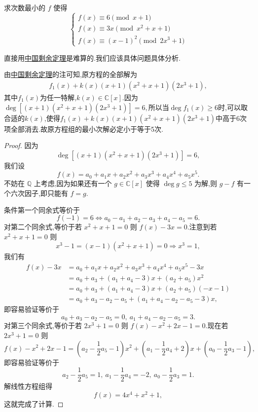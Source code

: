 \documentclass[../../main.tex]{subfiles}%
\begin{document}
\begin{example}
求次数最小的 \( f \) 使得
\[
\begin{cases}
f(x) \equiv 6 \pmod{x + 1} \\
f(x) \equiv 3x \pmod{x^2 + x + 1} \\
f(x) \equiv (x - 1)^2 \pmod{2x^3 + 1}
\end{cases}
\]
\end{example}
\begin{remark}
直接用\hyperref[theorem:中国剩余定理(多项式版)]{中国剩余定理}是难算的.我们应该具体问题具体分析.
\end{remark}
\begin{remark}
由\hyperref[theorem:中国剩余定理(多项式版)]{中国剩余定理}的注可知,原方程的全部解为
\begin{align*}
f_1\left( x \right) +k\left( x \right) \left( x+1 \right) \left( x^2+x+1 \right) \left( 2x^3+1 \right) ,
\end{align*}
其中$f_1(x)$为任一特解,$k(x)\in \mathbb{C}[x]$.因为$\deg\left[(x + 1)(x^2 + x + 1)(2x^3 + 1)\right] = 6,$所以当$\deg f_1(x)\geqslant  6$时,可以取合适的$k(x)$,使得$f_1\left( x \right) +k\left( x \right) \left( x+1 \right) \left( x^2+x+1 \right) \left( 2x^3+1 \right)$中高于6次项全部消去.故原方程组的最小次解必定小于等于5次.
\end{remark}
\begin{proof}

因为
\[
\deg\left[(x + 1)(x^2 + x + 1)(2x^3 + 1)\right] = 6,
\]
我们设
\[
f(x) = a_0 + a_1x + a_2x^2 + a_3x^3 + a_4x^4 + a_5x^5.
\]
不妨在 \( \mathbb{Q} \) 上考虑,因为如果还有一个 \( g \in \mathbb{C}[x] \) 使得 \( \deg g \leqslant  5 \) 为解,则 \( g - f \) 有一个六次因子,即只能有 \( f = g \).

条件第一个同余式等价于
\[
f(-1) = 6 \Leftrightarrow a_0 - a_1 + a_2 - a_3 + a_4 - a_5 = 6.
\]
对第二个同余式,等价于若 \( x^2 + x + 1 = 0 \) 则 \( f(x) - 3x = 0 \).注意到若 \( x^2 + x + 1 = 0 \) 则
\[
x^3 - 1 = (x - 1)(x^2 + x + 1) = 0 \Rightarrow x^3 = 1,
\]
我们有
\begin{align*}
f(x)-3x&=a_0+a_1x+a_2x^2+a_3x^3+a_4x^4+a_5x^5-3x
\\
&=a_0+a_3+(a_1+a_4-3)x+(a_2+a_5)x^2
\\
&=a_0+a_3+(a_1+a_4-3)x+(a_2+a_5)\left( -x-1 \right) 
\\
&=a_0+a_3-a_2-a_5+(a_1+a_4-a_2-a_5-3)x,
\end{align*}
即容易验证等价于
\[
a_0 + a_3 - a_2 - a_5 = 0,\ a_1 + a_4 - a_2 - a_5 = 3.
\]
对第三个同余式,等价于若 \( 2x^3 + 1 = 0 \) 则 \( f(x) - x^2 + 2x - 1 = 0 \).现在若 \( 2x^3 + 1 = 0 \) 则
\[
f(x) - x^2 + 2x - 1 = \left(a_2 - \frac{1}{2}a_5 - 1\right)x^2 + \left(a_1 - \frac{1}{2}a_4 + 2\right)x + \left(a_0 - \frac{1}{2}a_3 - 1\right),
\]
即容易验证等价于
\[
a_2 - \frac{1}{2}a_5 = 1,\ a_1 - \frac{1}{2}a_4 = -2,\ a_0 - \frac{1}{2}a_3 = 1.
\]
解线性方程组得
\[
f(x) = 4x^4 + x^2 + 1,
\]
这就完成了计算.

\end{proof}
\end{document}

